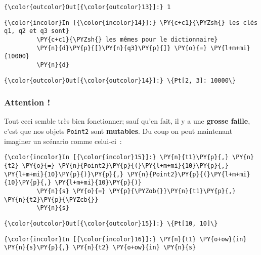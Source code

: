 \begin{Verbatim}[commandchars=\\\{\}]
{\color{outcolor}Out[{\color{outcolor}13}]:} 1
\end{Verbatim}
            
    \begin{Verbatim}[commandchars=\\\{\}]
{\color{incolor}In [{\color{incolor}14}]:} \PY{c+c1}{\PYZsh{} les clés q1, q2 et q3 sont}
         \PY{c+c1}{\PYZsh{} les mêmes pour le dictionnaire}
         \PY{n}{d}\PY{p}{[}\PY{n}{q3}\PY{p}{]} \PY{o}{=} \PY{l+m+mi}{10000}
         \PY{n}{d}
\end{Verbatim}


\begin{Verbatim}[commandchars=\\\{\}]
{\color{outcolor}Out[{\color{outcolor}14}]:} \{Pt[2, 3]: 10000\}
\end{Verbatim}
            
    \hypertarget{attention}{%
\subsubsection{Attention !}\label{attention}}

    Tout ceci semble très bien fonctionner; sauf qu'en fait, il y a une
\textbf{grosse faille}, c'est que nos objets \texttt{Point2} sont
\textbf{mutables}. Du coup on peut maintenant imaginer un scénario comme
celui-ci~:

    \begin{Verbatim}[commandchars=\\\{\}]
{\color{incolor}In [{\color{incolor}15}]:} \PY{n}{t1}\PY{p}{,} \PY{n}{t2} \PY{o}{=} \PY{n}{Point2}\PY{p}{(}\PY{l+m+mi}{10}\PY{p}{,} \PY{l+m+mi}{10}\PY{p}{)}\PY{p}{,} \PY{n}{Point2}\PY{p}{(}\PY{l+m+mi}{10}\PY{p}{,} \PY{l+m+mi}{10}\PY{p}{)}
         \PY{n}{s} \PY{o}{=} \PY{p}{\PYZob{}}\PY{n}{t1}\PY{p}{,} \PY{n}{t2}\PY{p}{\PYZcb{}}
         \PY{n}{s}
\end{Verbatim}


\begin{Verbatim}[commandchars=\\\{\}]
{\color{outcolor}Out[{\color{outcolor}15}]:} \{Pt[10, 10]\}
\end{Verbatim}
            
    \begin{Verbatim}[commandchars=\\\{\}]
{\color{incolor}In [{\color{incolor}16}]:} \PY{n}{t1} \PY{o+ow}{in} \PY{n}{s}\PY{p}{,} \PY{n}{t2} \PY{o+ow}{in} \PY{n}{s}
\end{Verbatim}


